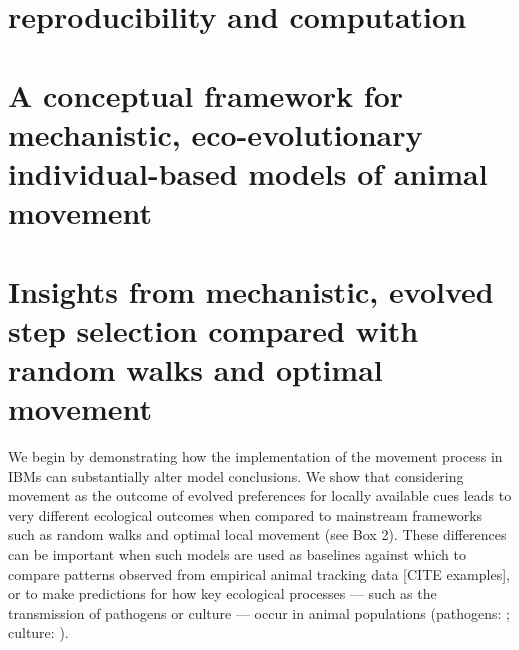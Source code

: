 \section*{reproducibility and computation}

\section*{A conceptual framework for mechanistic, eco-evolutionary individual-based models of animal movement}




\section*{Insights from mechanistic, evolved step selection compared with random walks and optimal movement}

We begin by demonstrating how the implementation of the movement process in IBMs can substantially alter model conclusions.
We show that considering movement as the outcome of evolved preferences for locally available cues leads to very different ecological outcomes when compared to mainstream frameworks such as random walks and optimal local movement (see Box 2).
These differences can be important when such models are used as baselines against which to compare patterns observed from empirical animal tracking data [CITE examples], or to make predictions for how key ecological processes --- such as the transmission of pathogens or culture --- occur in animal populations (pathogens: \cite{white2018,white2018b,cantor2021,scherer2020}; culture: \cite{romano2020,romano2021,cantor2021,cantor2021a}).

